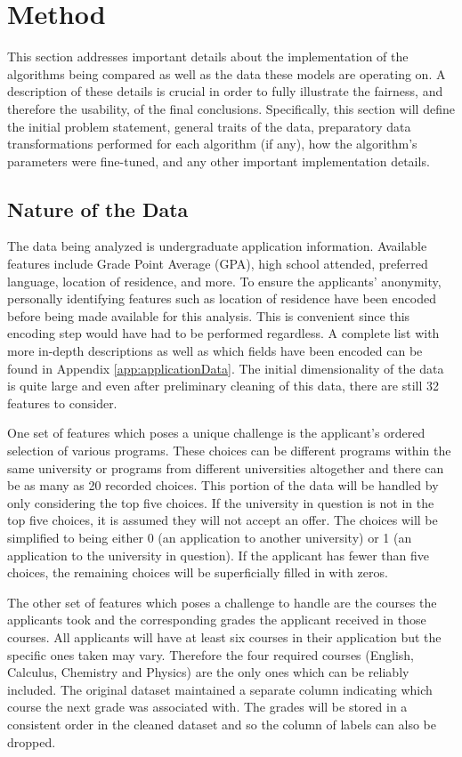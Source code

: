 \chapter{Method}
This section addresses important details about the implementation of the algorithms being compared as well as the data these models are operating on. A description of these details is crucial in order to fully illustrate the fairness, and therefore the usability, of the final conclusions. Specifically, this section will define the initial problem statement, general traits of the data, preparatory data transformations performed for each algorithm (if any), how the algorithm's parameters were fine-tuned, and any other important implementation details.



\section{Nature of the Data}
The data being analyzed is undergraduate application information. Available features include Grade Point Average (GPA), high school attended, preferred language, location of residence, and more. To ensure the applicants' anonymity, personally identifying features such as location of residence have been encoded before being made available for this analysis. This is convenient since this encoding step would have had to be performed regardless. A complete list with more in-depth descriptions as well as which fields have been encoded can be found in Appendix \ref{app:applicationData}. The initial dimensionality of the data is quite large and even after preliminary cleaning of this data, there are still 32 features to consider.

One set of features which poses a unique challenge is the applicant's ordered selection of various programs. These choices can be different programs within the same university or programs from different universities altogether and there can be as many as 20 recorded choices. This portion of the data will be handled by only considering the top five choices. If the university in question is not in the top five choices, it is assumed they will not accept an offer. The choices will be simplified to being either 0 (an application to another university) or 1 (an application to the university in question). If the applicant has fewer than five choices, the remaining choices will be superficially filled in with zeros.

The other set of features which poses a challenge to handle are the courses the applicants took and the corresponding grades the applicant received in those courses. All applicants will have at least six courses in their application but the specific ones taken may vary. Therefore the four required courses (English, Calculus, Chemistry and Physics) are the only ones which can be reliably included. The original dataset maintained a separate column indicating which course the next grade was associated with. The grades will be stored in a consistent order in the cleaned dataset and so the column of labels can also be dropped.

